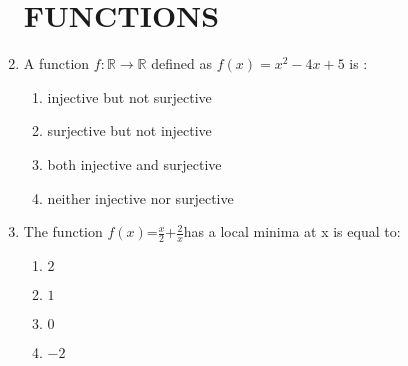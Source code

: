 \documentclass{article}
\begin{document}
				\begin{enumerate}
						\section{FUNCTIONS}
        \item A function $f :\mathbb{R} \rightarrow \mathbb{R}$ defined as $f(x) = x^2 - 4x +5 $ is :
                \begin{enumerate}[label=(\Alph*)]
                \item injective but not surjective
\item surjective but not injective
\item both injective and surjective
\item neither injective nor surjective
\end{enumerate}
\item The function $f(x)$=$\frac{x}{2}$+$\frac{2}{x}$has a local minima at x is equal to:

        \begin{enumerate}[label=(\Alph*)]
                        \item$2$
                        \item$1$
                        \item$0$
                        \item$-2$
                \end{enumerate}
				\end{enumerate}
\end{document}
